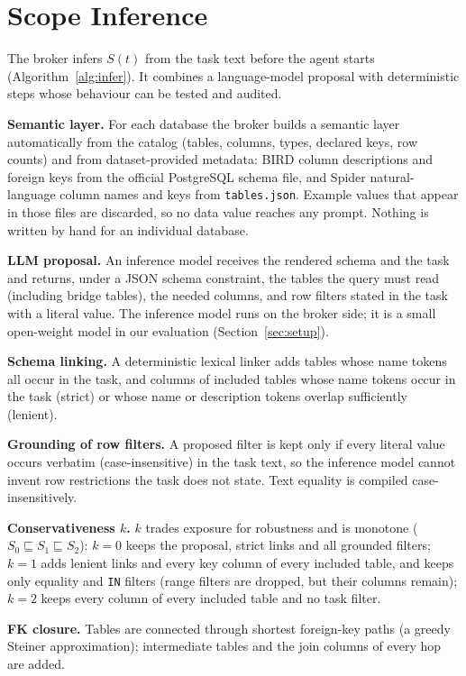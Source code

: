 \section{Scope Inference}
\label{sec:inference}

The broker infers $S(t)$ from the task text before the agent starts (Algorithm~\ref{alg:infer}). It combines a
language-model proposal with deterministic steps whose behaviour can be tested and audited.

\textbf{Semantic layer.} For each database the broker builds a semantic layer automatically from the catalog
(tables, columns, types, declared keys, row counts) and from dataset-provided metadata: BIRD column
descriptions and foreign keys from the official PostgreSQL schema file, and Spider natural-language column
names and keys from \texttt{tables.json}. Example values that appear in those files are discarded, so no data
value reaches any prompt. Nothing is written by hand for an individual database.

\textbf{LLM proposal.} An inference model receives the rendered schema and the task and returns, under a JSON
schema constraint, the tables the query must read (including bridge tables), the needed columns, and row
filters stated in the task with a literal value. The inference model runs on the broker side; it is a small
open-weight model in our evaluation (Section~\ref{sec:setup}).

\textbf{Schema linking.} A deterministic lexical linker adds tables whose name tokens all occur in the task, and
columns of included tables whose name tokens occur in the task (strict) or whose name or description tokens
overlap sufficiently (lenient).

\textbf{Grounding of row filters.} A proposed filter is kept only if every literal value occurs verbatim
(case-insensitive) in the task text, so the inference model cannot invent row restrictions the task does not
state. Text equality is compiled case-insensitively.

\textbf{Conservativeness $k$.} $k$ trades exposure for robustness and is monotone ($S_0\sqsubseteq S_1\sqsubseteq S_2$):
$k{=}0$ keeps the proposal, strict links and all grounded filters; $k{=}1$ adds lenient links and every key
column of every included table, and keeps only equality and \texttt{IN} filters (range filters are dropped,
but their columns remain); $k{=}2$ keeps every column of every included table and no task filter.

\textbf{FK closure.} Tables are connected through shortest foreign-key paths (a greedy Steiner approximation);
intermediate tables and the join columns of every hop are added.

